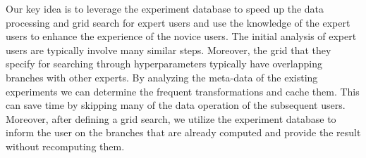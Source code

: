 Our key idea is to leverage the experiment database to speed up the data processing and grid search for expert users and use the knowledge of the expert users to enhance the experience of the novice users.
The initial analysis of expert users are typically involve many similar steps.
Moreover, the grid that they specify for searching through hyperparameters typically have overlapping branches with other experts.
By analyzing the meta-data of the existing experiments we can determine the frequent transformations and cache them.
This can save time by skipping many of the data operation of the subsequent users.
Moreover, after defining a grid search, we utilize the experiment database to inform the user on the branches that are already computed and provide the result without recomputing them.